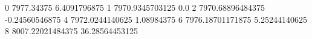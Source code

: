 0 7977.34375 6.4091796875
1 7970.9345703125 0.0
2 7970.68896484375 -0.24560546875
4 7972.0244140625 1.08984375
6 7976.18701171875 5.25244140625
8 8007.22021484375 36.28564453125
